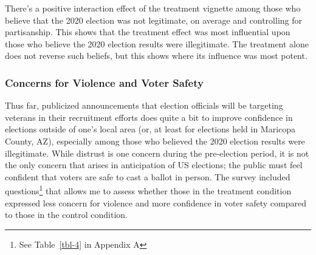\documentclass[
  12pt,
  letterpaper,
]{article}
\begin{document}
There's a positive interaction effect of the treatment vignette among
those who believe that the 2020 election was not legitimate, on average
and controlling for partisanship. This shows that the treatment effect
was most influential upon those who believe the 2020 election results
were illegitimate. The treatment alone does not reverse such beliefs,
but this shows where its influence was most potent.

\subsubsection{Concerns for Violence and Voter
Safety}\label{concerns-for-violence-and-voter-safety}

Thus far, publicized announcements that election officials will be
targeting veterans in their recruitment efforts does quite a bit to
improve confidence in elections outside of one's local area (or, at
least for elections held in Maricopa County, AZ), especially among those
who believed the 2020 election results were illegitimate. While distrust
is one concern during the pre-election period, it is not the only
concern that arises in anticipation of US elections; the public must
feel confident that voters are safe to cast a ballot in person. The
survey included questions\footnote{See Table~\ref{tbl-4} in Appendix A}
that allows me to assess whether those in the treatment condition
expressed less concern for violence and more confidence in voter safety
compared to those in the control condition.
\end{document}
